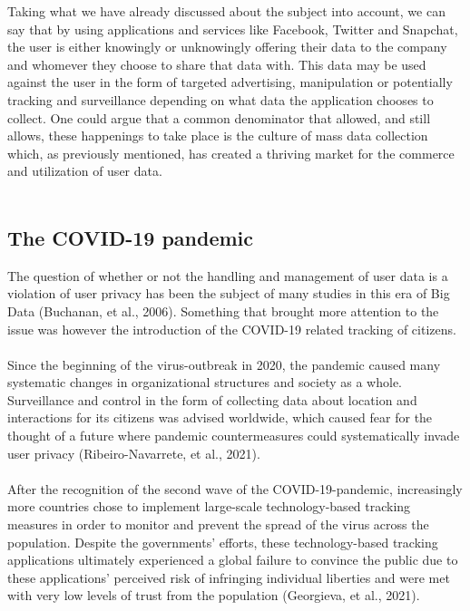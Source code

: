 \documentclass[11pt]{article}
\begin{document}
 

Taking what we have already discussed about the subject into account, we can say that by using applications and services like Facebook, Twitter and Snapchat, the user is either knowingly or unknowingly offering their data to the company and whomever they choose to share that data with. This data may be used against the user in the form of targeted advertising, manipulation or potentially tracking and surveillance depending on what data the application chooses to collect. One could argue that a common denominator that allowed, and still allows, these happenings to take place is the culture of mass data collection which, as previously mentioned, has created a thriving market for the commerce and utilization of user data.  \\ \\

\subsection{The COVID-19 pandemic}
The question of whether or not the handling and management of user data is a violation of user privacy has been the subject of many studies in this era of Big Data (Buchanan, et al., 2006). Something that brought more attention to the issue was however the introduction of the COVID-19 related tracking of citizens. \\ \\

Since the beginning of the virus-outbreak in 2020, the pandemic caused many systematic changes in organizational structures and society as a whole. Surveillance and control in the form of collecting data about location and interactions for its citizens was advised worldwide, which caused fear for the thought of a future where pandemic countermeasures could systematically invade user privacy (Ribeiro-Navarrete, et al., 2021).  \\ \\

After the recognition of the second wave of the COVID-19-pandemic, increasingly more countries chose to implement large-scale technology-based tracking measures in order to monitor and prevent the spread of the virus across the population. Despite the governments’ efforts, these technology-based tracking applications ultimately experienced a global failure to convince the public due to these applications’ perceived risk of infringing individual liberties and were met with very low levels of trust from the population (Georgieva, et al., 2021).  \\ \\
\end{document}
